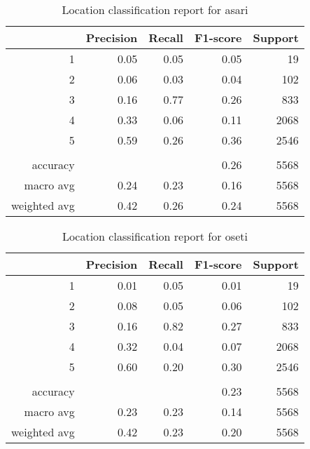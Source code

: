 \documentclass[12pt]{article}
\begin{document}
	\begin{table}
		\begin{center}
			{\renewcommand{\arraystretch}{1.5}
				\renewcommand{\tabcolsep}{0.2cm}
				\begin{tabular}{r r r r r}
					& Precision & Recall & F1-score & Support\\
					\hline
					1 & 0.05 & 0.05 & 0.05 & 19\\
					2 & 0.06 & 0.03 & 0.04 & 102\\
					3 & 0.16 & 0.77 & 0.26 & 833\\
					4 & 0.33 & 0.06 & 0.11 & 2068\\
					5 & 0.59 & 0.26 & 0.36 & 2546\\
					& & & & \\
					accuracy & & & 0.26 & 5568\\
					macro avg & 0.24 & 0.23 & 0.16 & 5568\\
					weighted avg & 0.42 & 0.26 & 0.24 & 5568
			\end{tabular}}
		\end{center}
		\caption{Location classification report for asari}
	\end{table}
	
	\begin{table}
		\begin{center}
			{\renewcommand{\arraystretch}{1.5}
				\renewcommand{\tabcolsep}{0.2cm}
				\begin{tabular}{r r r r r}
					& Precision & Recall & F1-score & Support\\
					\hline
					1 & 0.01 & 0.05 & 0.01 & 19\\
					2 & 0.08 & 0.05 & 0.06 & 102\\
					3 & 0.16 & 0.82 & 0.27 & 833\\
					4 & 0.32 & 0.04 & 0.07 & 2068\\
					5 & 0.60 & 0.20 & 0.30 & 2546\\
					& & & & \\
					accuracy & & & 0.23 & 5568\\
					macro avg & 0.23 & 0.23 & 0.14 & 5568\\
					weighted avg & 0.42 & 0.23 & 0.20 & 5568
			\end{tabular}}
		\end{center}
		\caption{Location classification report for oseti}
	\end{table}
	
\end{document}
